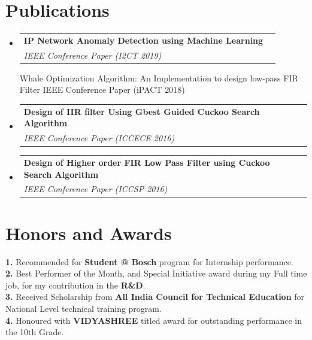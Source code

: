 \documentclass[A4,11pt]{article}
\makeatletter
\newcommand{\CVSubheading}[4]{
  \vspace{-2pt}\item
    \begin{tabular*}{0.97\textwidth}[t]{l@{\extracolsep{\fill}}r}
      \textbf{#1} & \small{#2} \\
      \textit{\small#3} & \textit{\small #4} \\
    \end{tabular*}\vspace{-7pt}
}
\newcommand{\CVSubHeadingListStart}{\vspace{1pt}\begin{itemize}[leftmargin=0.5cm, label={}]}
\newcommand{\CVSubHeadingListEnd}{\end{itemize}}
\makeatother
\begin{document}
\section{\textbf{Publications}}

  \CVSubHeadingListStart
    \CVSubheading
      {IP Network Anomaly Detection using Machine
Learning}{\href{https://ieeexplore.ieee.org/document/9033545}{\faExternalLink}}
      {IEEE Conference Paper (I2CT 2019){}}
      
    \CVSubheading
      {Whale Optimization Algorithm: An Implementation
to design low-pass FIR Filter}{\href{https://ieeexplore.ieee.org/document/8244929}{\faExternalLink}}
      {IEEE Conference Paper (iPACT 2018)}{}
      
    \CVSubheading
      {Design of IIR filter Using Gbest Guided Cuckoo
Search Algorithm}{\href{https://ieeexplore.ieee.org/document/8009573}{\faExternalLink}}
      {IEEE Conference Paper (ICCECE 2016)}{}
          \CVSubheading
      {Design of Higher order FIR Low Pass Filter using
Cuckoo Search Algorithm}{\href{https://ieeexplore.ieee.org/document/7754285}{\faExternalLink}}
      {IEEE Conference Paper (ICCSP 2016)}{}
  \CVSubHeadingListEnd

\section{\textbf{Honors and Awards}}
 \begin{itemize}[leftmargin=0.5cm, label={}]
    \small{\item{
     \textbf{1. }{Recommended for \textbf{Student @ Bosch} program for Internship performance.} \\
         \textbf{2. }{Best Performer of the Month, and Special Initiative award during my Full time job, for my contribution in the \textbf{R\&D}.}\\
\textbf{3. }{Received Scholarship from \textbf{All India Council for Technical Education} for National Level technical training program.} \\
     \textbf{4. }{Honoured with \textbf{VIDYASHREE} titled award for outstanding performance in the 10th Grade.} \\
     

 

    }}
 \end{itemize}

\end{document}
